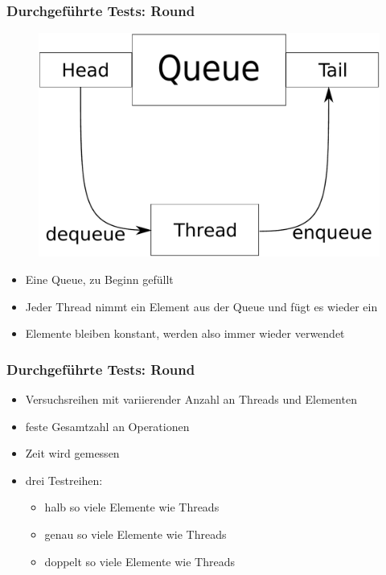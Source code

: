 \documentclass[svgnames]{beamer}
\begin{document}
\begin{frame}
\frametitle{Durchgef\"uhrte Tests: Round}
\begin {figure}
      \begin{center}
	\includegraphics[scale=0.25]{round.pdf}
     \end{center}
\end {figure}

\begin{itemize}
 \item Eine Queue, zu Beginn gef\"ullt
 \item Jeder Thread nimmt ein Element aus der Queue und f\"ugt es wieder ein
 \item Elemente bleiben konstant, werden also immer wieder verwendet
\end{itemize}
\end{frame}
\begin{frame}
\frametitle{Durchgef\"uhrte Tests: Round}
\begin{itemize}
 \item Versuchsreihen mit variierender Anzahl an Threads und Elementen
 \item feste Gesamtzahl an Operationen
 \item Zeit wird gemessen
 \item drei Testreihen:
\begin{itemize}
 \item halb so viele Elemente wie Threads
 \item genau so viele Elemente wie Threads
 \item doppelt so viele Elemente wie Threads
\end{itemize}
\end{itemize}
\end{frame}
\end{document}
